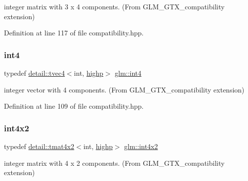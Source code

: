 integer matrix with 3 x 4 components. (From G\+L\+M\+\_\+\+G\+T\+X\+\_\+compatibility extension) 



Definition at line 117 of file compatibility.\+hpp.

\mbox{\label{group__gtx__compatibility_ga9f621a690aa1c2918a9a8a684376b562}} 
\subsubsection{\texorpdfstring{int4}{int4}}
{\footnotesize\ttfamily typedef \hyperlink{structglm_1_1detail_1_1tvec4}{detail\+::tvec4}$<$int, \hyperlink{namespaceglm_a0f04f086094c747d227af4425893f545ac6f7eab42eacbb10d59a58e95e362074}{highp}$>$ \hyperlink{group__gtx__compatibility_ga9f621a690aa1c2918a9a8a684376b562}{glm\+::int4}}



integer vector with 4 components. (From G\+L\+M\+\_\+\+G\+T\+X\+\_\+compatibility extension) 



Definition at line 109 of file compatibility.\+hpp.

\mbox{\label{group__gtx__compatibility_gac391157aca117c5d52b10c2c3ca5c9be}} 
\subsubsection{\texorpdfstring{int4x2}{int4x2}}
{\footnotesize\ttfamily typedef \hyperlink{structglm_1_1detail_1_1tmat4x2}{detail\+::tmat4x2}$<$int, \hyperlink{namespaceglm_a0f04f086094c747d227af4425893f545ac6f7eab42eacbb10d59a58e95e362074}{highp}$>$ \hyperlink{group__gtx__compatibility_gac391157aca117c5d52b10c2c3ca5c9be}{glm\+::int4x2}}



integer matrix with 4 x 2 components. (From G\+L\+M\+\_\+\+G\+T\+X\+\_\+compatibility extension) 



